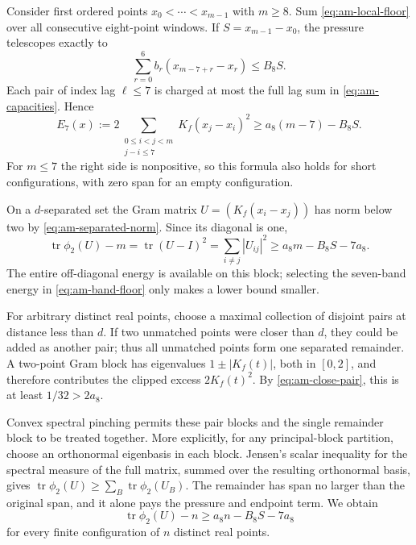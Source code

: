 \documentclass[11pt,reqno]{amsart}
\numberwithin{equation}{section}
\begin{document}
Consider first ordered points $x_0<\cdots<x_{m-1}$ with $m\ge8$.
Sum \eqref{eq:am-local-floor} over all consecutive eight-point
windows. If $S=x_{m-1}-x_0$, the pressure telescopes exactly to
\begin{equation}
 \sum_{r=0}^6 b_r(x_{m-7+r}-x_r)\le B_8S.
 \label{eq:am-pressure-telescope}
\end{equation}
Each pair of index lag $\ell\le7$ is charged at most the full
lag sum in \eqref{eq:am-capacities}. Hence
\begin{equation}
 E_7(x):=2\sum_{\substack{0\le i<j<m\\j-i\le7}}
                 K_f(x_j-x_i)^2
 \ge a_8(m-7)-B_8S.
 \label{eq:am-band-floor}
\end{equation}
For $m\le7$ the right side is nonpositive, so this formula also holds
for short configurations, with zero span for an empty configuration.

On a $d$-separated set the Gram matrix $U=(K_f(x_i-x_j))$ has norm
below two by \eqref{eq:am-separated-norm}. Since its diagonal is one,
\begin{equation}
 \operatorname{tr}\phi_2(U)-m
  =\operatorname{tr}(U-I)^2
  =\sum_{i\ne j}|U_{ij}|^2
  \ge a_8m-B_8S-7a_8.
 \label{eq:am-separated-defect}
\end{equation}
The entire off-diagonal energy is available on this block; selecting
the seven-band energy in \eqref{eq:am-band-floor} only makes a lower
bound smaller.

For arbitrary distinct real points, choose a maximal collection of
disjoint pairs at distance less than $d$. If two unmatched points were
closer than $d$, they could be added as another pair; thus all unmatched
points form one separated remainder. A two-point Gram block has
eigenvalues $1\pm|K_f(t)|$, both in $[0,2]$, and therefore contributes
the clipped excess $2K_f(t)^2$. By \eqref{eq:am-close-pair}, this
is at least $1/32>2a_8$.

Convex spectral pinching permits these pair blocks and the single
remainder block to be treated together. More explicitly, for any
principal-block partition, choose an orthonormal eigenbasis in each
block. Jensen's scalar inequality for the spectral measure of the
full matrix, summed over the resulting orthonormal basis, gives
$\operatorname{tr}\phi_2(U)\ge\sum_B\operatorname{tr}\phi_2(U_B)$.
The remainder has span no larger than the original span, and it alone
pays the pressure and endpoint term. We obtain
\begin{equation}
 \operatorname{tr}\phi_2(U)-n
 \ge a_8n-B_8S-7a_8
 \label{eq:am-global-affine}
\end{equation}
for every finite configuration of $n$ distinct real points.
\end{document}
